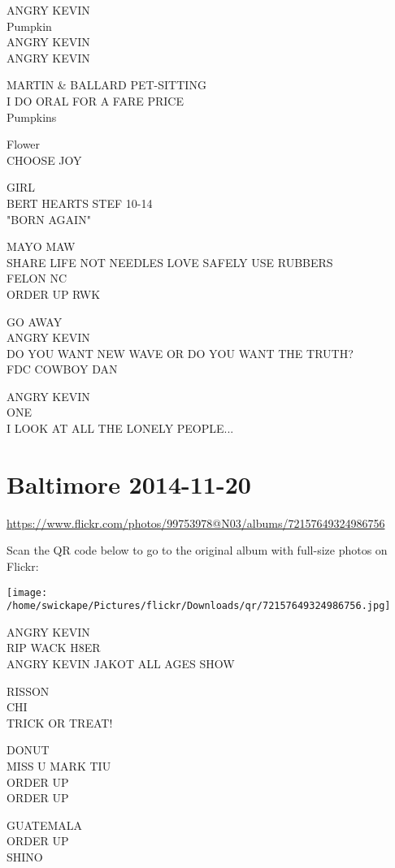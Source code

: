 \documentclass[10pt,letterpaper]{article}
\begin{document}
ANGRY KEVIN\\
Pumpkin\\
ANGRY KEVIN\\
ANGRY KEVIN

MARTIN \& BALLARD PET{-}SITTING\\
I DO ORAL FOR A FARE PRICE\\
Pumpkins

Flower\\
CHOOSE JOY

GIRL\\
BERT HEARTS STEF 10{-}14\\
"BORN AGAIN"

MAYO MAW\\
SHARE LIFE NOT NEEDLES LOVE SAFELY USE RUBBERS\\
FELON NC\\
ORDER UP RWK

GO AWAY\\
ANGRY KEVIN\\
DO YOU WANT NEW WAVE OR DO YOU WANT THE TRUTH?\\
FDC COWBOY DAN

ANGRY KEVIN\\
ONE\\
I LOOK AT ALL THE LONELY PEOPLE...


\section*{Baltimore 2014-11-20}

\url{https://www.flickr.com/photos/99753978@N03/albums/72157649324986756}

Scan the QR code below to go to the original album with full-size photos on Flickr:

\texttt{[image: /home/swickape/Pictures/flickr/Downloads/qr/72157649324986756.jpg]}


ANGRY KEVIN\\
RIP WACK H8ER\\
ANGRY KEVIN JAKOT ALL AGES SHOW

RISSON\\
CHI\\
TRICK OR TREAT!

DONUT\\
MISS U MARK TIU\\
ORDER UP\\
ORDER UP

GUATEMALA\\
ORDER UP\\
SHINO
\end{document}

